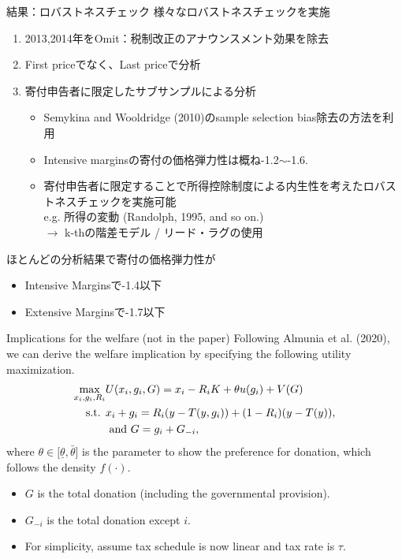 \documentclass[dvipdfmx,10pt]{beamer}
\begin{document}
\begin{frame}{結果：ロバストネスチェック}
 様々なロバストネスチェックを実施
		\begin{enumerate}
			\item 2013,2014年をOmit：税制改正のアナウンスメント効果を除去
			\item First priceでなく、Last priceで分析
			\item 寄付申告者に限定したサブサンプルによる分析
			\begin{itemize}
				\item Semykina and Wooldridge (2010)のsample selection bias除去の方法を利用
				\item Intensive marginsの寄付の価格弾力性は概ね-1.2\(\sim\)-1.6.
				\item 寄付申告者に限定することで所得控除制度による内生性を考えたロバストネスチェックを実施可能\\
				e.g. 所得の変動 (Randolph, 1995, and so on.)\\
				$\to$ k-thの階差モデル / リード・ラグの使用  
			\end{itemize}
		\end{enumerate}
		ほとんどの分析結果で寄付の価格弾力性が
		\begin{itemize}
			\item Intensive Marginsで-1.4以下 
			\item Extensive Marginsで-1.7以下
		\end{itemize}
\end{frame}

\begin{frame}{Implications for the welfare (not in the paper)}
	Following Almunia et al. (2020), we can derive the welfare implication by specifying the following utility maximization.
	\begin{align}
		\max_{x_i,g_i,R_i}&U(x_i,g_i,G)= x_i - R_iK +\theta u(g_i) + V(G)\notag\\
		\text{s.t. }&x_i + g_i = R_i(y-T(y, g_i)) + (1-R_i)(y-T(y)),\notag\\
		&\text{ and }G=g_i+G_{-i}\notag,
	\end{align}
	where $\theta\in[\underline{\theta},\bar{\theta}$] is the parameter to show the preference for donation, which follows the density $f(\cdot)$. 
	\begin{itemize}
		\item $G$ is the total donation (including the governmental provision).
		\item $G_{-i}$ is the total donation except $i$.
		\item For simplicity, assume tax schedule is now linear and tax rate is $\tau$.
	\end{itemize}
\end{frame}
\end{document}
